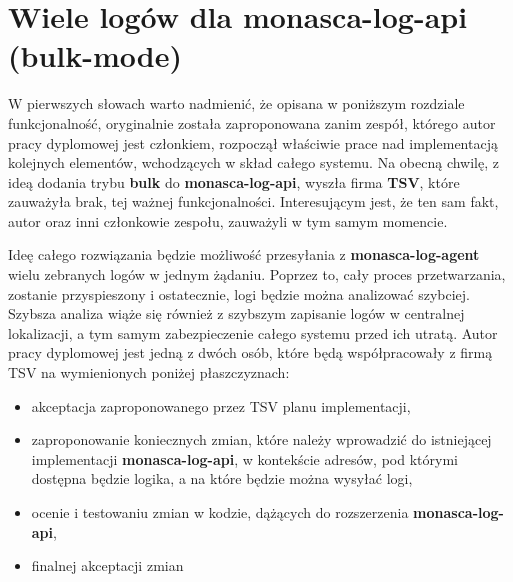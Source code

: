 \section{Wiele logów dla monasca-log-api (bulk-mode)}
\label{chapter:application_own:plans:bulk_monasca_log_api}

W pierwszych słowach warto nadmienić, że opisana w poniższym rozdziale funkcjonalność, oryginalnie została 
zaproponowana zanim zespół, którego autor pracy dyplomowej jest członkiem, rozpoczął właściwie prace
nad implementacją kolejnych elementów, wchodzących w skład całego systemu. Na obecną chwilę, z ideą 
dodania trybu \textbf{bulk} do \textbf{monasca-log-api}, wyszła firma \textbf{TSV}, które zauważyła brak, tej
ważnej funkcjonalności. Interesującym jest, że ten sam fakt, autor oraz inni członkowie zespołu, zauważyli
w tym samym momencie. 

Ideę całego rozwiązania będzie możliwość przesyłania z \textbf{monasca-log-agent} wielu zebranych logów
w jednym żądaniu. Poprzez to, cały proces przetwarzania, zostanie przyspieszony i ostatecznie, logi
będzie można analizować szybciej. Szybsza analiza wiąże się również z szybszym zapisanie logów w centralnej lokalizacji,
a tym samym zabezpieczenie całego systemu przed ich utratą. Autor pracy dyplomowej jest jedną z dwóch osób, które będą
współpracowały z firmą TSV na wymienionych poniżej płaszczyznach:
\begin{itemize}
    \item akceptacja zaproponowanego przez TSV planu implementacji,
    \item zaproponowanie koniecznych zmian, które należy wprowadzić do istniejącej implementacji \textbf{monasca-log-api},
    w kontekście adresów, pod którymi dostępna będzie logika, a na które będzie można wysyłać logi,
    \item ocenie i testowaniu zmian w kodzie, dążących do rozszerzenia \textbf{monasca-log-api},
    \item finalnej akceptacji zmian
\end{itemize}